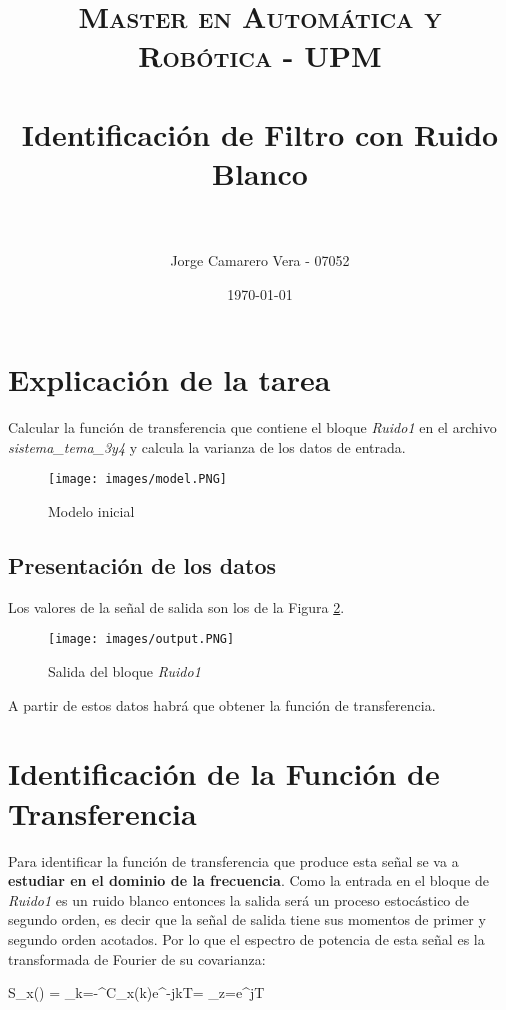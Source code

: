 \documentclass[a4paper, fontsize=11pt]{scrartcl} %
\title{	
	\normalfont \normalsize 
	\textsc{Master en Automática y Robótica - UPM} \\ [25pt] %
	\horrule{0.5pt} \\[0.4cm] %
	\huge Identificación de Filtro con Ruido Blanco \\ %
	\horrule{2pt} \\[0.5cm] %
}
\author{Jorge Camarero Vera - 07052} %
\date{\normalsize\today} %
\numberwithin{equation}{section} %
\numberwithin{figure}{section} %
\numberwithin{table}{section} %
\newenvironment{myalign}{\par\nobreak\large\noindent\align}{\endalign} %
\begin{document}
	\maketitle
	
	\section{Explicación de la tarea}
	
	Calcular la función de transferencia que contiene el bloque \textit{Ruido1} en el archivo \textit{sistema\_tema\_3y4} y calcula la varianza de los datos de entrada. 
	
	\begin{figure}[h!]
		\centering
		\texttt{[image: images/model.PNG]}
		\caption{Modelo inicial}
		\label{Modelo Inicial}
	\end{figure}
	\FloatBarrier
	
	\subsection{Presentación de los datos}
	
	Los valores de la señal de salida son los de la Figura \ref{Salida}.
	
	\begin{figure}[h!]
		\centering
		\texttt{[image: images/output.PNG]}
		\caption{Salida del bloque \textit{Ruido1}}
		\label{Salida}
	\end{figure}
	\FloatBarrier
	
	
	A partir de estos datos habrá que obtener la función de transferencia.

	\section{Identificación de la Función de Transferencia}	
	
	Para identificar la función de transferencia que produce esta señal se va a \textbf{estudiar en el dominio de la frecuencia}. Como la entrada en el bloque de \textit{Ruido1} es un ruido blanco entonces la salida será un proceso estocástico de segundo orden, es decir que la señal de salida tiene sus momentos de primer y segundo orden acotados. Por lo que el espectro de potencia de esta señal es la transformada de Fourier de su covarianza:
	
	\begin{myalign}
		S_x(\omega) = \sum_{k=-\infty}^{\infty}C_x(k)e^{-j\omega kT}= \left[ C_x(x) \right]_{z=e^{j\omega T}}
		\label{Fourier}
	\end{myalign}
	
\end{document}
